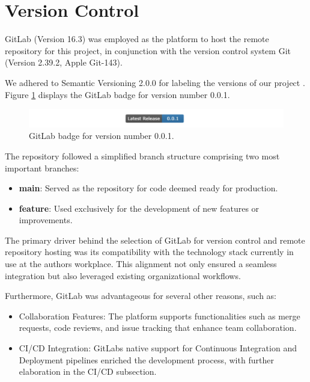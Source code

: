 \section{Version Control}\label{version-control}

GitLab (Version 16.3) was employed as the platform to host the remote
repository for this project, in conjunction with the version control
system Git (Version 2.39.2, Apple Git-143).

We adhered to Semantic Versioning 2.0.0 for labeling the versions of our
project \cite{42}. Figure \ref{fig:badge}
displays the GitLab badge for version number 0.0.1.

\begin{figure}[ht]
  \centering
  \includegraphics[width=\textwidth]{media/fig4.png}
  \caption{GitLab badge for version number 0.0.1.}
  \label{fig:badge}
\end{figure}


The repository followed a simplified branch structure comprising two
most important branches:

\begin{itemize}
\item
  \textbf{main}: Served as the repository for code deemed ready for
  production.
\item
  \textbf{feature}: Used exclusively for the development of new features
  or improvements.
\end{itemize}

The primary driver behind the selection of GitLab for version control
and remote repository hosting was its compatibility with the technology
stack currently in use at the author\textquotesingle s workplace. This
alignment not only ensured a seamless integration but also leveraged
existing organizational workflows.

Furthermore, GitLab was advantageous for several other reasons, such as:

\begin{itemize}
\item
  Collaboration Features: The platform supports functionalities such as
  merge requests, code reviews, and issue tracking that enhance team
  collaboration.
\item
  CI/CD Integration: GitLab\textquotesingle s native support for
  Continuous Integration and Deployment pipelines enriched the
  development process, with further elaboration in the CI/CD subsection.
\end{itemize}

